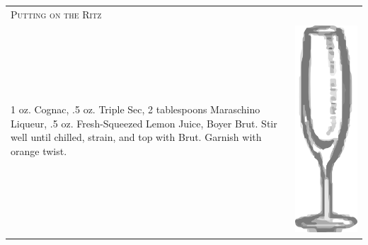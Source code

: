 \documentclass{article}
\begin{document}
\begin{multicols}{2}
\begin{tabular}{p{2in} p{0.5in}}
\multicolumn{2}{p{3in}}{\centering\Huge\textsc{Putting on the Ritz}} \\ 
   \vspace{-0.1in}1 oz. Cognac, .5 oz. Triple Sec, 2 tablespoons Maraschino Liqueur, .5 oz. Fresh-Squeezed Lemon Juice, Boyer Brut. Stir well until chilled, strain, and top with Brut. Garnish with orange twist. &
   \vspace{-0.1in} \includegraphics{flute.png}
\end{tabular}


\end{multicols}
\end{document}
